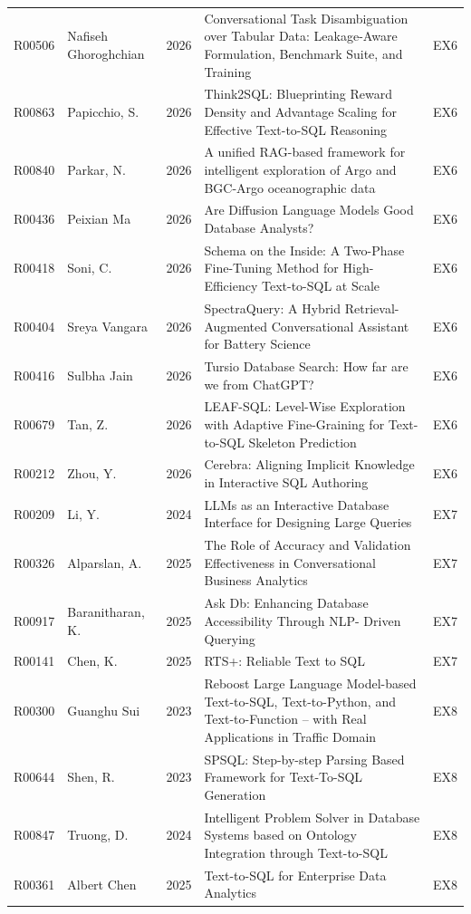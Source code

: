 {\begin{longtable}{@{}l p{3.0cm} l p{11.2cm} l@{}}
R00506 & Nafiseh Ghoroghchian & 2026 & Conversational Task Disambiguation over Tabular Data: Leakage-Aware Formulation, Benchmark Suite, and Training & EX6 \\
R00863 & Papicchio, S. & 2026 & Think2SQL: Blueprinting Reward Density and Advantage Scaling for Effective Text-to-SQL Reasoning & EX6 \\
R00840 & Parkar, N. & 2026 & A unified RAG-based framework for intelligent exploration of Argo and BGC-Argo oceanographic data & EX6 \\
R00436 & Peixian Ma & 2026 & Are Diffusion Language Models Good Database Analysts? & EX6 \\
R00418 & Soni, C. & 2026 & Schema on the Inside: A Two-Phase Fine-Tuning Method for High-Efficiency Text-to-SQL at Scale & EX6 \\
R00404 & Sreya Vangara & 2026 & SpectraQuery: A Hybrid Retrieval-Augmented Conversational Assistant for Battery Science & EX6 \\
R00416 & Sulbha Jain & 2026 & Tursio Database Search: How far are we from ChatGPT? & EX6 \\
R00679 & Tan, Z. & 2026 & LEAF-SQL: Level-Wise Exploration with Adaptive Fine-Graining for Text-to-SQL Skeleton Prediction & EX6 \\
R00212 & Zhou, Y. & 2026 & Cerebra: Aligning Implicit Knowledge in Interactive SQL Authoring & EX6 \\
R00209 & Li, Y. & 2024 & LLMs as an Interactive Database Interface for Designing Large Queries & EX7 \\
R00326 & Alparslan, A. & 2025 & The Role of Accuracy and Validation Effectiveness in Conversational Business Analytics & EX7 \\
R00917 & Baranitharan, K. & 2025 & Ask Db: Enhancing Database Accessibility Through NLP- Driven Querying & EX7 \\
R00141 & Chen, K. & 2025 & RTS+: Reliable Text to SQL & EX7 \\
R00300 & Guanghu Sui & 2023 & Reboost Large Language Model-based Text-to-SQL, Text-to-Python, and Text-to-Function -- with Real Applications in Traffic Domain & EX8 \\
R00644 & Shen, R. & 2023 & SPSQL: Step-by-step Parsing Based Framework for Text-To-SQL Generation & EX8 \\
R00847 & Truong, D. & 2024 & Intelligent Problem Solver in Database Systems based on Ontology Integration through Text-to-SQL & EX8 \\
R00361 & Albert Chen & 2025 & Text-to-SQL for Enterprise Data Analytics & EX8 \\

\end{longtable}}
